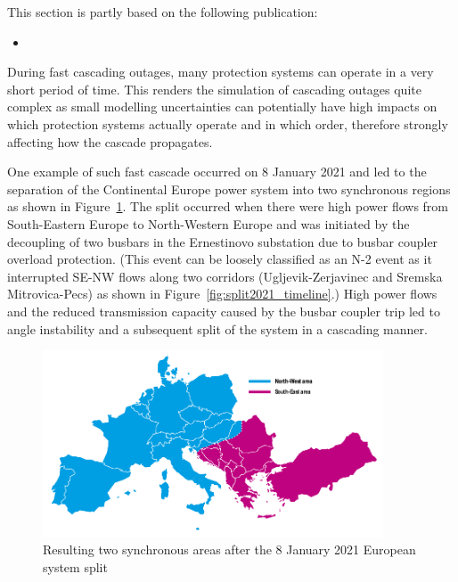 \begin{tcolorbox}[width=\linewidth, sharp corners=all,
    colback=white!80!black,
    colframe=white!80!black]
This section is partly based on the following publication:
\begin{itemize}
    \item {}
\end{itemize}
\end{tcolorbox}

During fast cascading outages, many protection systems can operate in a very short period of time. This renders the simulation of cascading outages quite complex as small modelling uncertainties can potentially have high impacts on which protection systems actually operate and in which order, therefore strongly affecting how the cascade propagates.

One example of such fast cascade occurred on 8 January 2021 and led to the separation of the Continental Europe power system into two synchronous regions as shown in Figure~\ref{fig:split2021}. The split occurred when there were high power flows from South-Eastern Europe to North-Western Europe and was initiated by the decoupling of two busbars in the Ernestinovo substation due to busbar coupler overload protection. (This event can be loosely classified as an N-2 event as it interrupted SE-NW flows along two corridors (Ugljevik-Zerjavinec and Sremska Mitrovica-Pecs) as shown in Figure~\ref{fig:split2021_timeline}.) High power flows and the reduced transmission capacity caused by the busbar coupler trip led to angle instability and a subsequent split of the system in a cascading manner.

\begin{figure}
    \centering
    \includegraphics[width = 0.9\textwidth]{Figs/SystemSplit2021.pdf}
    \caption{Resulting two synchronous areas after the 8 January 2021 European system split~\cite{ENTSOESplitJan2021}}
    \label{fig:split2021}
\end{figure}

